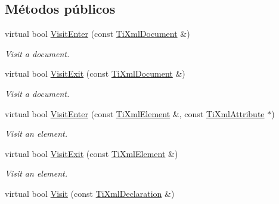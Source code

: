 \subsection*{\-Métodos públicos}
\begin{DoxyCompactItemize}
\item 
\hypertarget{classTiXmlVisitor_a07baecb52dd7d8716ae2a48ad0956ee0}{virtual bool \hyperlink{classTiXmlVisitor_a07baecb52dd7d8716ae2a48ad0956ee0}{\-Visit\-Enter} (const \hyperlink{classTiXmlDocument}{\-Ti\-Xml\-Document} \&)}\label{classTiXmlVisitor_a07baecb52dd7d8716ae2a48ad0956ee0}

\begin{DoxyCompactList}\small\item\em \-Visit a document. \end{DoxyCompactList}\item 
\hypertarget{classTiXmlVisitor_aa0ade4f27087447e93974e975c3246ad}{virtual bool \hyperlink{classTiXmlVisitor_aa0ade4f27087447e93974e975c3246ad}{\-Visit\-Exit} (const \hyperlink{classTiXmlDocument}{\-Ti\-Xml\-Document} \&)}\label{classTiXmlVisitor_aa0ade4f27087447e93974e975c3246ad}

\begin{DoxyCompactList}\small\item\em \-Visit a document. \end{DoxyCompactList}\item 
\hypertarget{classTiXmlVisitor_af6c6178ffa517bbdba95d70490875fff}{virtual bool \hyperlink{classTiXmlVisitor_af6c6178ffa517bbdba95d70490875fff}{\-Visit\-Enter} (const \hyperlink{classTiXmlElement}{\-Ti\-Xml\-Element} \&, const \hyperlink{classTiXmlAttribute}{\-Ti\-Xml\-Attribute} $\ast$)}\label{classTiXmlVisitor_af6c6178ffa517bbdba95d70490875fff}

\begin{DoxyCompactList}\small\item\em \-Visit an element. \end{DoxyCompactList}\item 
\hypertarget{classTiXmlVisitor_aec2b1f8116226d52f3a1b95dafd3a32c}{virtual bool \hyperlink{classTiXmlVisitor_aec2b1f8116226d52f3a1b95dafd3a32c}{\-Visit\-Exit} (const \hyperlink{classTiXmlElement}{\-Ti\-Xml\-Element} \&)}\label{classTiXmlVisitor_aec2b1f8116226d52f3a1b95dafd3a32c}

\begin{DoxyCompactList}\small\item\em \-Visit an element. \end{DoxyCompactList}\item 
\hypertarget{classTiXmlVisitor_afad71c71ce6473fb9b4b64cd92de4a19}{virtual bool \hyperlink{classTiXmlVisitor_afad71c71ce6473fb9b4b64cd92de4a19}{\-Visit} (const \hyperlink{classTiXmlDeclaration}{\-Ti\-Xml\-Declaration} \&)}\label{classTiXmlVisitor_afad71c71ce6473fb9b4b64cd92de4a19}


\end{DoxyCompactItemize}
